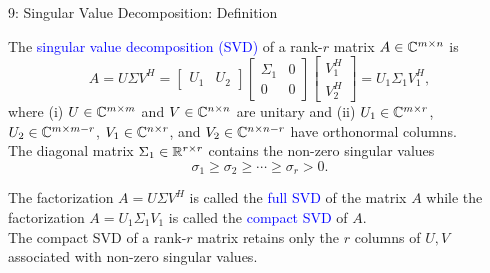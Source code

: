\documentclass[10pt,english,aspectratio=169]{beamer}
\begin{document}
\begin{frame}{9: Singular Value Decomposition: Definition}

\begin{definition}
The \textcolor{blue}{singular value decomposition (SVD)} of a rank-$r$ matrix $A \in \mathbb{C}^{m \times n}$ is \vspace{-1mm}
\begin{equation*}
A = U \Sigma V^H
= \left[ \begin{array}{cc} U_1 & U_2 \end{array} \right]
\left[ \begin{array}{cc} \Sigma_1 & 0 \\ 0 & 0 \end{array} \right]
\left[ \begin{array}{c} V_1^H \\ V_2^H \end{array} \right]
= U_1 \Sigma_1 V_1^H,
\end{equation*}
where (i) $U \in \mathbb{C}^{m \times m}$ and $V \in \mathbb{C}^{n \times n}$ are unitary and (ii) $U_1 \in \mathbb{C}^{m \times r}$, $U_2 \in \mathbb{C}^{m \times m-r}$, $V_1 \in \mathbb{C}^{n \times r}$, and $V_2 \in \mathbb{C}^{n \times n-r}$ have orthonormal columns.
\\ The diagonal matrix $\Sigma_1 \in \mathbb{R}^{r \times r}$ contains the non-zero singular values \vspace{-2mm}
\[ \sigma_1 \geq \sigma_2 \geq \cdots \geq \sigma_r > 0. \]
\end{definition}

\vspace{1mm}

The factorization $A = U \Sigma V^H$ is called the \textcolor{blue}{full SVD} of the matrix $A$ while the factorization $A = U_1 \Sigma_1 V_1$ is called the \textcolor{blue}{compact SVD} of $A$.
\\[1mm] The compact SVD of a rank-$r$ matrix retains only the $r$ columns of $U,V$ associated with non-zero singular values.

\end{frame}
\end{document}
